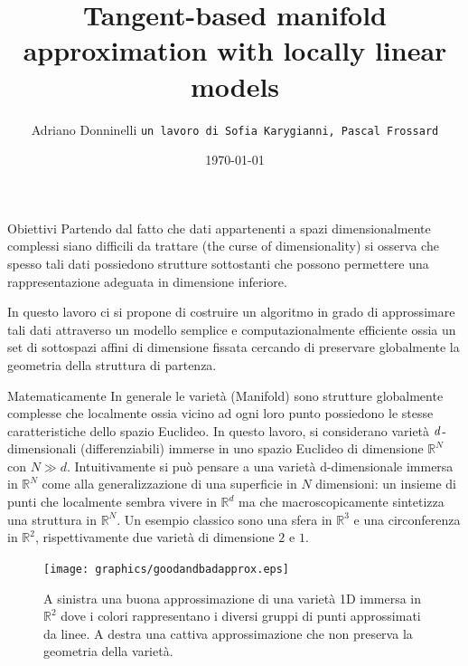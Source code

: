 \documentclass[usenames,dvipsnames,9pt]{beamer}
\title[Università di Bologna]{\Huge{Tangent-based manifold approximation with locally linear models}}
\date[\today]{\small\today}
\author[Adriano Donninelli]{
  Adriano Donninelli
  \pdfnewline
  \texttt{un lavoro di Sofia Karygianni, Pascal Frossard}
}
\institute{Università di Bologna}
\newcommand{\RR}{\mathbb{R}}
\theoremstyle{definition}
\begin{document}
\large

\begin{frame}
\titlepage
\end{frame}

\begin{frame}{Obiettivi}
Partendo dal fatto che dati appartenenti a spazi dimensionalmente complessi siano difficili da trattare (the curse of dimensionality)
si osserva che spesso tali dati possiedono strutture sottostanti che possono permettere una rappresentazione adeguata in dimensione inferiore.
\vskip 0.2in

In questo lavoro ci si propone di costruire un algoritmo in grado di approssimare tali dati attraverso un modello semplice e computazionalmente efficiente ossia un set di sottospazi affini di dimensione fissata cercando di preservare globalmente la geometria della struttura di partenza.
\end{frame}

\begin{frame}{Matematicamente}
In generale le varietà (Manifold) sono strutture globalmente complesse che localmente ossia vicino ad ogni loro punto possiedono le stesse caratteristiche dello spazio Euclideo. In questo lavoro, si considerano varietà $\it d$-dimensionali (differenziabili) immerse in uno spazio Euclideo di dimensione $\RR^{N}$ con $N \gg d$.
	Intuitivamente si può pensare a una varietà d-dimensionale immersa in $\RR^{N}$ come alla generalizzazione di una superficie in $N$ dimensioni: un insieme di punti che localmente sembra vivere in $\RR^{d}$ ma che macroscopicamente sintetizza una struttura in $\RR^{N}$.
\vskip 0.2in
Un esempio classico sono una sfera in $\RR^{3}$ e una circonferenza in $\RR^{2}$, rispettivamente due varietà di dimensione $2$ e $1$.
\end{frame}

\begin{frame}
\begin{figure}[b]
\centering
\texttt{[image: graphics/goodandbadapprox.eps]}
\caption{A sinistra una buona approssimazione di una varietà 1D immersa in $\RR^{2}$ dove i colori rappresentano i diversi gruppi di punti approssimati da linee. A destra una cattiva approssimazione che non preserva la geometria della varietà.}
\end{figure}
\end{frame}
\end{document}
